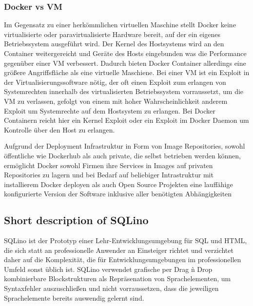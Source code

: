 \subsubsection{Docker vs VM}

Im Gegensatz zu einer herkömmlichen virtuellen Maschine stellt Docker keine
virtualisierte oder paravirtualisierte Hardware bereit, auf der ein eigenes
Betriebssystem ausgeführt wird. Der Kernel des Hostsystems wird an den Container
weitergereicht und Geräte des Hosts eingebunden was die Performance gegenüber
einer VM verbessert. Dadurch bieten Docker Container allerdings eine größere
Angriffsfläche als eine virtuelle Maschiene. Bei einer VM ist ein Exploit in der
Virtualisierungssoftware nötig, der oft einen Exploit zum erlangen von
Systemrechten innerhalb des virtualisierten Betriebssystem vorraussetzt, um die
VM zu verlassen, gefolgt von einem mit hoher Wahrscheinlichkeit anderem Exploit
um Systemrechte auf dem Hostsystem zu erlangen. Bei Docker Containern reicht
hier ein Kernel Exploit oder ein Exploit im Docker Daemon um Kontrolle über den
Host zu erlangen.

Aufgrund der Deployment Infrastruktur in Form von Image Repositories, sowohl
öffentliche wie Dockerhub als auch private, die selbst betrieben werden können,
ermöglicht Docker sowohl Firmen ihre Services in Images auf privaten
Repositories zu lagern und bei Bedarf auf beliebiger Intrastruktur mit
installierem Docker deployen als auch Open Source Projekten eine lauffähige
konfigurierte Version der Software inklusive aller benötigten Abhängigkeiten 

\subsection{Short description of SQLino}

SQLino ist der Prototyp einer Lehr-Entwicklungsumgebung für SQL und HTML, die
sich statt an professionelle Anwender an Einsteiger richtet und verzichtet daher
auf die Komplexität, die für Entwicklungsumgebungen im professionellen Umfeld
sonst üblich ist. SQLino verwendet grafische per Drag \`n Drop kombinierbare
Blockstrukturen als Repräsenation von Sprachelementen, um Syntaxfehler
auszuschließen und nicht vorraussetzen, dass die jeweiligen Sprachelemente
bereits auswendig gelernt sind.


